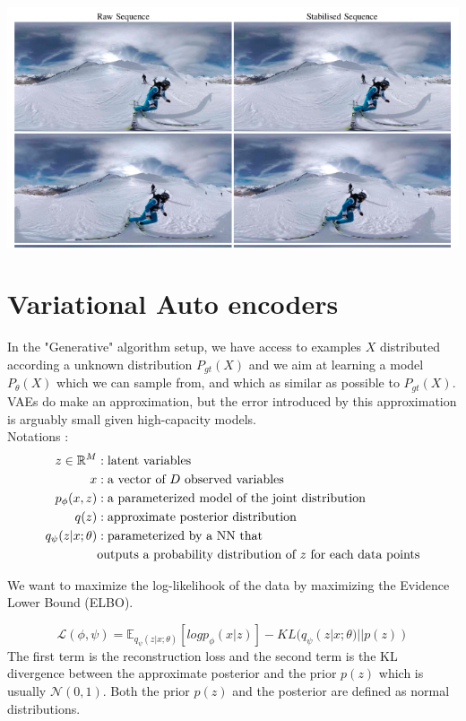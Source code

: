 \documentclass[12pt]{article}
\newcommand{\RR}{\mathbb{R}} %
\newcommand{\EE}{\mathbb{E}} %
\begin{document}
\includegraphics[width=\textwidth]{Slides/figures/spherical_video.png}

\section{Variational Auto encoders}
In the "Generative" algorithm setup, we have access to examples $X$ distributed according a unknown distribution $P_{gt}(X)$ and we aim at learning a model $P_{\theta}(X)$ which we can sample from, and 
which as similar as possible to $P_{gt}(X)$. \\
VAEs do make an approximation, but the error introduced by this approximation is arguably small given high-capacity models. \\ 

Notations :
\begin{align*}
    z\in\RR^M &: \textrm{latent variables} \\
    x &: \textmd{a vector of $D$ observed variables} \\
    p_\phi(x, z) &: \textrm{a parameterized model of the joint distribution}\\
    q(z) &: \textrm{approximate posterior distribution} \\
    q_\psi(z|x;\theta) &: \textrm{parameterized by a NN that}\\ 
    &\textrm{outputs a probability distribution of $z$ for each data points}
\end{align*}

We want to maximize the log-likelihook of the data by maximizing the Evidence Lower Bound (ELBO).

$$
\mathcal{L}(\phi, \psi) = \EE_{q_{\psi}(z|x; \theta)}[log p_{\phi}(x|z)] - KL(q_{\psi}(z|x;\theta) || p(z))
$$
The first term is the reconstruction loss and the second term is the KL divergence between the approximate posterior and the prior $p(z)$ which is usually $\mathcal{N}(0, 1)$.
Both the prior $p(z)$ and the posterior are defined as normal distributions.
\end{document}
